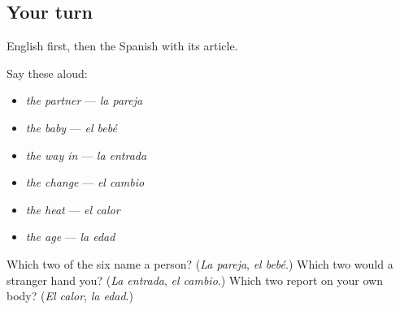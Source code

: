 \subsection*{Your turn}
English first, then the Spanish with its article.

Say these aloud:

\begin{itemize}
\raggedright
  \item \emph{the partner} --- \emph{la pareja}
  \item \emph{the baby} --- \emph{el bebé}
  \item \emph{the way in} --- \emph{la entrada}
  \item \emph{the change} --- \emph{el cambio}
  \item \emph{the heat} --- \emph{el calor}
  \item \emph{the age} --- \emph{la edad}
\end{itemize}

\begin{tcolorbox}[breakable,colback=teal!4,colframe=teal!35!black,title={Before you move on}]
Which two of the six name a person? (\emph{La pareja}, \emph{el bebé}.) Which two would a stranger hand you? (\emph{La entrada}, \emph{el cambio}.) Which two report on your own body? (\emph{El calor}, \emph{la edad}.)
\end{tcolorbox}
